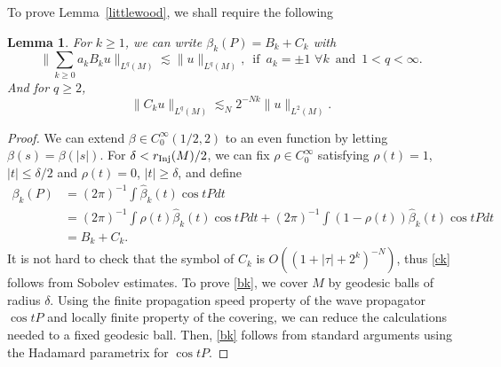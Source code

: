 \documentclass[10pt]{amsart}
\newtheorem{lemma}[theorem]{Lemma}
\newcommand{\Inj}{r_{\rm{Inj}}}
\newcommand{\1}{{\bf 1}}
\begin{document}
To prove Lemma~\ref{littlewood}, we shall require the following
\begin{lemma}\label{parametrix} For $k\ge 1$, we can write 
$\beta_k(P)=B_k+C_k$ with
\begin{equation}\label{bk}
    \|\sum_{k\ge 0}a_kB_ku\|_{L^q(M)}\lesssim  \|u\|_{L^q(M)},\,\,\,\text{if}\,\,\,a_k=\pm 1 \,\,\forall k \,\,\,\text{and}\,\,\,1<q<\infty.
\end{equation}
And for $q\ge 2$, 
\begin{equation}\label{ck}
    \|C_ku\|_{L^q(M)}\lesssim_N 2^{-Nk}\|u\|_{L^2(M)}.
\end{equation}
\end{lemma}
\begin{proof} We can extend $\beta\in C_0^\infty (1/2, 2)$ to an even function by letting $\beta(s)=\beta(|s|)$. For $\delta<\Inj(M)/2$,  we can fix $\rho\in C_0^\infty$ satisfying $\rho(t)= 1$, $|t|\le \delta/2$ and $\rho(t)=0 $, $|t|\ge \delta$, and define
\begin{equation}
\begin{aligned}
     \beta_k(P)&=(2\pi)^{-1}\int\hat \beta_k(t)\cos tP dt  \\
      &=(2\pi)^{-1}\int\rho(t)\hat \beta_k(t)\cos tP dt+ (2\pi)^{-1}\int (1-\rho(t))\hat \beta_k(t)\cos tP dt\\
      &=B_k+C_k.
\end{aligned}
\end{equation}
    It is not hard to check that the symbol of $C_k$ is $O((1+|\tau|+2^k)^{-N})$, thus \eqref{ck} follows from Sobolev estimates. To prove \eqref{bk}, we cover $M$ by geodesic balls of radius $\delta$. Using the finite propagation speed property of the wave propagator $\cos tP$ and locally finite property of the covering, we can reduce the calculations needed to a fixed geodesic ball. Then, \eqref{bk} follows from standard arguments using the Hadamard parametrix for $\cos tP$.
\end{proof}
\end{document}
